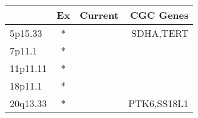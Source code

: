\begin{tabular}{lccr}
\toprule
{} & Ex & Current &    CGC Genes \\
\midrule
5p15.33  &  * &         &    SDHA,TERT \\
7p11.1   &  * &         &              \\
11p11.11 &  * &         &              \\
18p11.1  &  * &         &              \\
20q13.33 &  * &         &  PTK6,SS18L1 \\
\bottomrule
\end{tabular}
